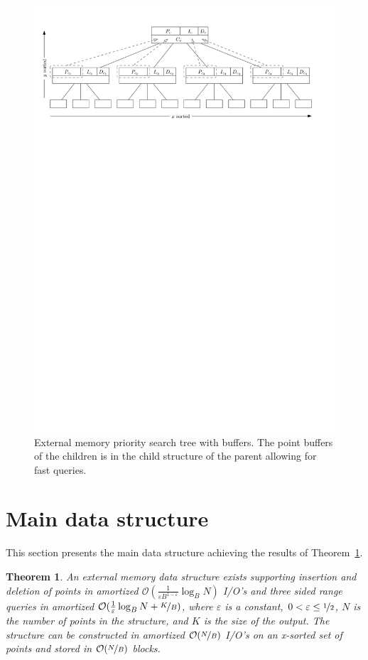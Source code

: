\documentclass[twoside,11pt,openright]{report}
\def \epsilon {\varepsilon}
\newtheorem{theorem}{Theorem}
\begin{document}
\begin{figure}
	\centering
	\includegraphics[width=\textwidth]{../figures/gerth_tree}
	\caption{External memory priority search tree with buffers. The point buffers of the children is in the child structure of the parent allowing for fast queries.}
	\label{fig:gerth_tree}
\end{figure}




\section{Main data structure}
\label{sec:main_data_structure}
This section presents the main data structure achieving the results of Theorem~\ref{thm:main_structure}.
\begin{theorem}
\label{thm:main_structure}
An external memory data structure exists supporting insertion and deletion of points in amortized $\mathcal{O}(\frac{1}{\epsilon B^{1-\epsilon}} \log_B N)$ I/O's and three sided range queries in amortized $\mathcal{O}(\frac{1}{\epsilon} \log_B N + \nicefrac{K}{B})$, where $\epsilon$ is a constant, $0 < \epsilon \leq \nicefrac{1}{2}$, $N$ is the number of points in the structure, and $K$ is the size of the output. The structure can be constructed in amortized $\mathcal{O}(\nicefrac{N}{B})$ I/O's on an x-sorted set of points and stored in $\mathcal{O}(\nicefrac{N}{B})$ blocks.
\end{theorem}
\end{document}
